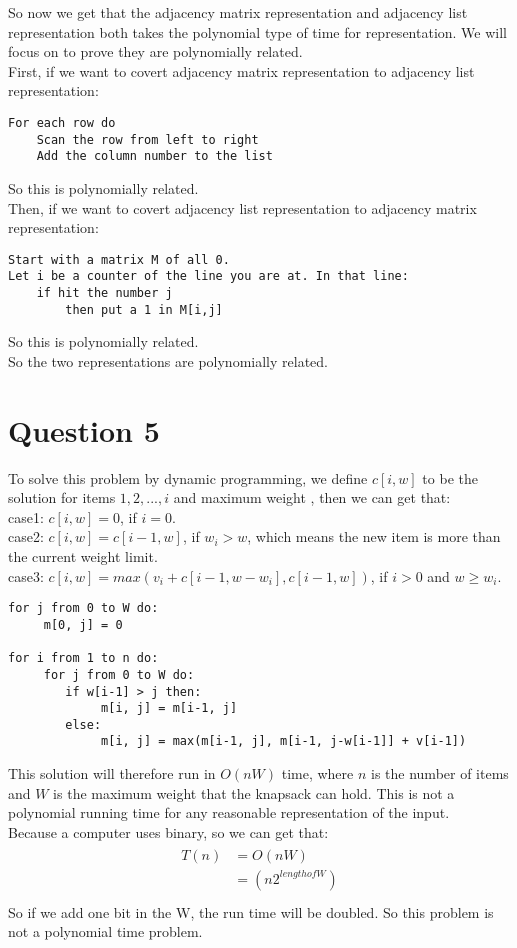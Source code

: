 \documentclass[paper=a4, fontsize=11pt]{scrartcl} %
\numberwithin{equation}{section} %
\numberwithin{figure}{section} %
\numberwithin{table}{section} %
\begin{document}
So now we get that the adjacency matrix representation and adjacency list representation both takes the polynomial type of time for representation. We will focus on to prove they are polynomially related.\\
First, if we want to covert adjacency matrix representation to adjacency list representation:
\begin{verbatim}
For each row do
    Scan the row from left to right
    Add the column number to the list
\end{verbatim} 
So this is polynomially related.\\
Then, if we want to covert adjacency list representation to adjacency matrix representation:
\begin{verbatim}
Start with a matrix M of all 0.
Let i be a counter of the line you are at. In that line:
    if hit the number j
        then put a 1 in M[i,j]
\end{verbatim} 
So this is polynomially related.\\
So the two representations are polynomially related.
\vspace{2cm}
\section{\textbf{Question 5}}
To solve this problem by dynamic programming, we define $c[i,w]$ to be the solution for items $1,2,...,i$ and maximum weight , then we can get that:\\
case1: $c[i,w]=0$,   if $i=0$. \\
case2: $c[i,w]=c[i-1,w]$,   if $w_i>w$, which means the new item is more than the current weight limit.\\
case3: $c[i,w]=max{(v_i+c[i-1,w-w_i],c[i-1,w])}$, if $i>0$ and $w\geq w_i$.\\
\begin{verbatim}
for j from 0 to W do:
     m[0, j] = 0
     
for i from 1 to n do:
     for j from 0 to W do:
        if w[i-1] > j then:
             m[i, j] = m[i-1, j]
        else:
             m[i, j] = max(m[i-1, j], m[i-1, j-w[i-1]] + v[i-1])
\end{verbatim} 
This solution will therefore run in $O(nW)$ time, where $n$ is the number of items and $W$ is the maximum weight that the knapsack can hold. This is not a polynomial running time for any reasonable representation of the input.\\
Because a computer uses binary, so we can get that:\\
\begin{align*}
\begin{split}
    T(n) &=O(nW)\\
         &=(n2^{length of W})\\
\end{split}
\end{align*}
So if we add one bit in the W, the run time will be doubled. So this problem is not a polynomial time problem.
\end{document}

